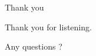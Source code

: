 \documentclass[ucs,9pt]{beamer}
\begin{document}
\begin{frame}{Thank you}

  Thank you for listening.

  \bigskip \pause
  Any questions ?
\end{frame}


%
%
%
%
%
%
%
%
%
%
%
%
%
%
%
%
\end{document}
